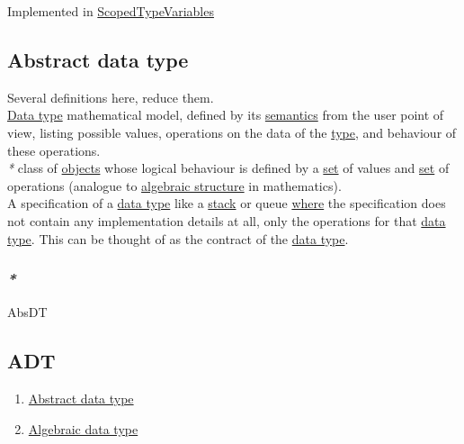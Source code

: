 \documentclass[11pt]{article}
\begin{document}
Implemented in \hyperref[org1f3d5d9]{ScopedTypeVariables}\\

\subsection{\label{org17c0ec9}Abstract data type}
\label{sec:org3e10de5}

Several definitions here, reduce them.\\

\hyperref[org965cde3]{Data type} mathematical model, defined by its \hyperref[org2f919bf]{semantics} from the user point of view, listing possible values, operations on the data of the \hyperref[org4fbaeb8]{type}, and behaviour of these operations.\\

\emph{*} class of \hyperref[orge0f000f]{objects} whose logical behaviour is defined by a \hyperref[orgbed80ba]{set} of values and \hyperref[orgbed80ba]{set} of operations (analogue to \hyperref[org461d8c5]{algebraic structure} in mathematics).\\

A specification of a \hyperref[org965cde3]{data type} like a \hyperref[org901a5a9]{stack} or queue \hyperref[orgefd1ecd]{where} the specification does not contain any implementation details at all, only the operations for that \hyperref[org965cde3]{data type}. This can be thought of as the contract of the \hyperref[org965cde3]{data type}.\\

\subsubsection{\emph{*}}
\label{sec:org9111a9f}

\label{org808e3fe}AbsDT\\

\subsection{\label{org9bfe45f}ADT}
\label{sec:org99b311a}
\begin{enumerate}
\item \hyperref[org17c0ec9]{Abstract data type}\\
\item \hyperref[orgeba275a]{Algebraic data type}\\
\end{enumerate}
\end{document}
